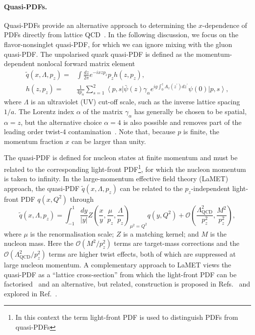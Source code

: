 \paragraph*{Quasi-PDFs.}
Quasi-PDFs provide an alternative approach to determining the $x$-dependence of PDFs directly from lattice QCD~\cite{Ji:2013dva,Ji:2014gla}. In the following discussion, we focus on the flavor-nonsinglet quasi-PDF, for which we can ignore mixing with the gluon quasi-PDF. The unpolarised quark quasi-PDF is defined as the momentum-dependent
nonlocal forward matrix element
\begin{align}\label{eq:qPDF}
\widetilde{q}(x,\Lambda,p_z)  = {} &  \int \frac{dz}{2\pi} e^{-i x z p_z} p_z h(z,p_z), \nonumber \\
h(z,p_z) = {} &
\frac{1}{4 p_{\alpha}}\sum_{s=1}^2\left\langle p,s\right\vert \bar{\psi}(z)\gamma_\alpha e^{ig\int_0^z
A_z(z^\prime) dz^\prime} \psi(0) \left\vert p,s\right\rangle,
\end{align}
where $\Lambda$ is an ultraviolet (UV) cut-off scale, such as the inverse lattice spacing $1/a$. The Lorentz index $\alpha$ of the matrix $\gamma_\alpha$ has generally be chosen to be spatial, $\alpha = z$, but the alternative choice $\alpha = 4$ is also possible and removes part of the leading order twist-4 contamination~\cite{Xiong:2013bka,Radyushkin:2016hsy}. 
Note that, because $p$ is finite, the momentum fraction $x$ can be larger than unity.

The quasi-PDF is defined for nucleon states at finite momentum and must be related to the corresponding light-front PDF\footnote{In this context the term light-front PDF is used to distinguish PDFs from quasi-PDFs}, for which the nucleon momentum is taken to infinity.
In the  large-momentum  effective field theory (LaMET) approach, the quasi-PDF $\widetilde{q}(x,\Lambda,p_z)$ can be related to the $p_z$-independent
light-front PDF $q(x,Q^2)$ through~\cite{Ji:2013dva,Ji:2014gla}
\begin{equation} \label{eq:qPDFmatching}
\widetilde{q}(x,\Lambda ,p_z) = 
  \int_{-1}^1 \frac{dy}{\left\vert y\right\vert} 
    Z\left( \frac{x}{y}, \frac{\mu}{p_z}, \frac{\Lambda}{p_z}\right)_{\mu^2 = Q^2} q(y,Q^2) +
  \mathcal{O}\left( \frac{\Lambda_\text{QCD}^2}{p_z^2},\frac{M^2}{p_z^2}\right), 
\end{equation}
where $\mu$ is the renormalisation scale;
$Z$ is a matching kernel; and $M$ is the nucleon mass.
Here the $\mathcal{O}\left(M^2/p_z^2\right)$ terms are target-mass corrections and the $\mathcal{O}\left(\Lambda_\text{QCD}^2/p_z^2\right)$ terms are higher twist effects, both of which are suppressed at large nucleon momentum. A complementary approach to LaMET views the quasi-PDF as a ``lattice cross-section'' from which the light-front PDF can be factorised~\cite{Ma:2014jla,Ma:2014jga,Ma:2017pxb} and an alternative, but related, construction is proposed in Refs.~\cite{Radyushkin:2016hsy,Radyushkin:2017cyf} and explored in Ref.~\cite{Orginos:2017kos}.

